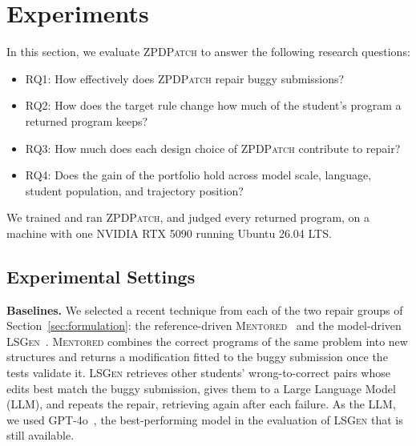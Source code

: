 \documentclass[10pt,conference]{IEEEtran}
\begin{document}
\section{Experiments}
\label{sec:experiment}
In this section, we evaluate \textsc{ZPDPatch} to answer the following research questions:
\begin{itemize}
\item RQ1: How effectively does \textsc{ZPDPatch} repair buggy submissions?
\item RQ2: How does the target rule change how much of the student's program a returned program keeps?
\item RQ3: How much does each design choice of \textsc{ZPDPatch} contribute to repair?
\item RQ4: Does the gain of the portfolio hold across model scale, language, student population, and trajectory position?
\end{itemize}
We trained and ran \textsc{ZPDPatch}, and judged every returned program, on a machine with one NVIDIA RTX 5090 running Ubuntu 26.04 LTS.

\subsection{Experimental Settings}
\label{sec:settings}


\noindent\textbf{Baselines.} We selected a recent technique from each of the two repair groups of Section~\ref{sec:formulation}: the reference-driven \textsc{Mentored}~\cite{choi2025automated} and the model-driven \textsc{LSGen}~\cite{dai2026learner}. \textsc{Mentored} combines the correct programs of the same problem into new structures and returns a modification fitted to the buggy submission once the tests validate it. \textsc{LSGen} retrieves other students' wrong-to-correct pairs whose edits best match the buggy submission, gives them to a Large Language Model (LLM), and repeats the repair, retrieving again after each failure. As the LLM, we used GPT-4o~\cite{hurst2024gpt}, the best-performing model in the evaluation of \textsc{LSGen} that is still available.
\end{document}
